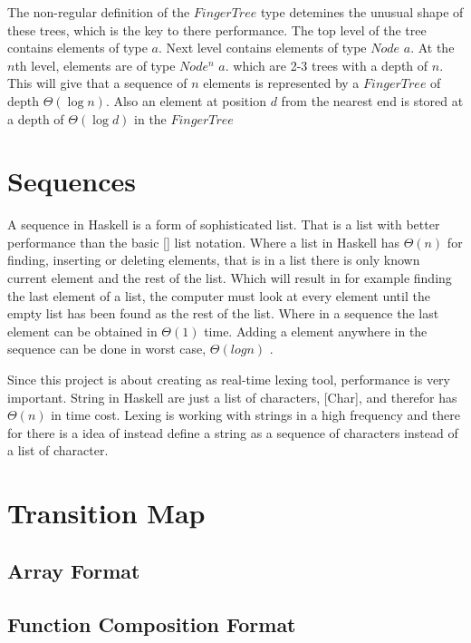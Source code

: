 The non-regular definition of the $FingerTree$ type detemines the unusual shape of these trees, which is the key to there performance. The top level of the tree contains elements of type $a$. Next level contains elements of type $Node$ $a$. At the $n$th level, elements are of type $Node^n$ $a$. which are 2-3 trees with a depth of $n$. This will give that a sequence of $n$ elements is represented by a $FingerTree$ of depth $\Theta(\log n)$. Also an element at position $d$ from the nearest end is stored at a depth of $\Theta(\log d)$ in the $FingerTree$ \cite{fingertree}

\section{Sequences}
A sequence in Haskell is a form of sophisticated list. That is a list with better performance than the basic [] list notation. Where a list in Haskell has $\Theta(n)$ for finding, inserting or deleting elements, that is in a list there is only known current element and the rest of the list. Which will result in for example finding the last element of a list, the computer must look at every element until the empty list has been found as the rest of the list. Where in a sequence the last element can be obtained in $\Theta(1)$ time. Adding a element anywhere in the sequence can be done in worst case, $\Theta(log n)$ \cite{fingertree}. 

Since this project is about creating as real-time lexing tool, performance is very important. String in Haskell are just a list of characters, [Char], and therefor has $\Theta(n)$ in time cost. Lexing is working with strings in a high frequency and there for there is a idea of instead define a string as a sequence of characters instead of a list of character. 

\section{Transition Map}
\subsection{Array Format}
\subsection{Function Composition Format}
